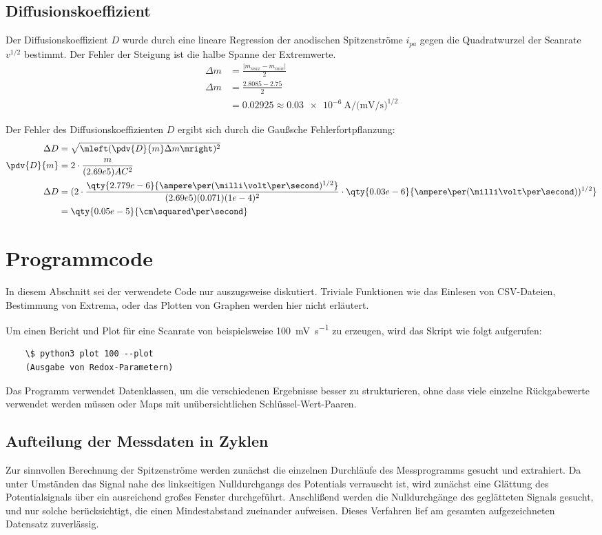 \subsection{Diffusionskoeffizient}
Der Diffusionskoeffizient $D$ wurde durch eine lineare Regression der anodischen Spitzenströme $i_{pa}$ gegen die Quadratwurzel der Scanrate $v^{1/2}$ bestimmt.
Der Fehler der Steigung ist die halbe Spanne der Extremwerte.
\begin{align*}
    \Delta m &= \frac{|m_{max} - m_{min}|}{2} \\
    \Delta m &= \frac{2.8085 - 2.75}{2} \\
             &= 0.02925 \approx \qty{0.03e-6}{\ampere\per(\milli\volt\per\second)^{1/2}}
\end{align*}

Der Fehler des Diffusionskoeffizienten $D$ ergibt sich durch die Gaußsche Fehlerfortpflanzung:
\begin{align*}
    \Delta D &= \sqrt{\mleft( \pdv{D}{m} \Delta m \mright)^2} \\
    \pdv{D}{m} &= 2 \cdot \frac{m}{(2.69e5)AC^2} \\
    \Delta D &= (2 \cdot \frac{\qty{2.779e-6}{\ampere\per(\milli\volt\per\second)^{1/2}}}{(2.69e5)(0.071)(1e-4)^2} \cdot \qty{0.03e-6}{\ampere\per(\milli\volt\per\second))^{1/2}} \\
            &= \qty{0.05e-5}{\cm\squared\per\second}
\end{align*}

\section{Programmcode}
In diesem Abschnitt sei der verwendete Code nur auszugsweise diskutiert.
Triviale Funktionen wie das Einlesen von CSV-Dateien, Bestimmung von Extrema, oder das Plotten von Graphen werden hier nicht erläutert.

Um einen Bericht und Plot für eine Scanrate von beispielsweise \qty{100}{\milli\volt\per\second} zu erzeugen, wird das Skript wie folgt aufgerufen:
\begin{verbatim}
    \$ python3 plot 100 --plot
    (Ausgabe von Redox-Parametern)
\end{verbatim}

Das Programm verwendet Datenklassen, um die verschiedenen Ergebnisse besser zu strukturieren, ohne dass viele einzelne Rückgabewerte verwendet werden müssen oder Maps mit unübersichtlichen Schlüssel-Wert-Paaren.

\subsection{Aufteilung der Messdaten in Zyklen}
Zur sinnvollen Berechnung der Spitzenströme werden zunächst die einzelnen Durchläufe des Messprogramms gesucht und extrahiert.
Da unter Umständen das Signal nahe des linkseitigen Nulldurchgangs des Potentials verrauscht ist, wird zunächst eine Glättung des Potentialsignals über ein ausreichend großes Fenster durchgeführt.
Anschlißend werden die Nulldurchgänge des geglätteten Signals gesucht, und nur solche berücksichtigt, die einen Mindestabstand zueinander aufweisen.
Dieses Verfahren lief am gesamten aufgezeichneten Datensatz zuverlässig.

